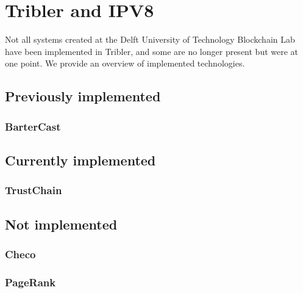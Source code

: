 \chapter{Tribler and IPV8}
Not all systems created at the Delft University of Technology Blockchain Lab have been implemented in Tribler, and some are no longer present but were at one point. We provide an overview of implemented technologies.

\section{Previously implemented}
\subsection{BarterCast}

\section{Currently implemented}
\subsection{TrustChain}

\section{Not implemented}
\subsection{Checo}

\subsection{PageRank}
